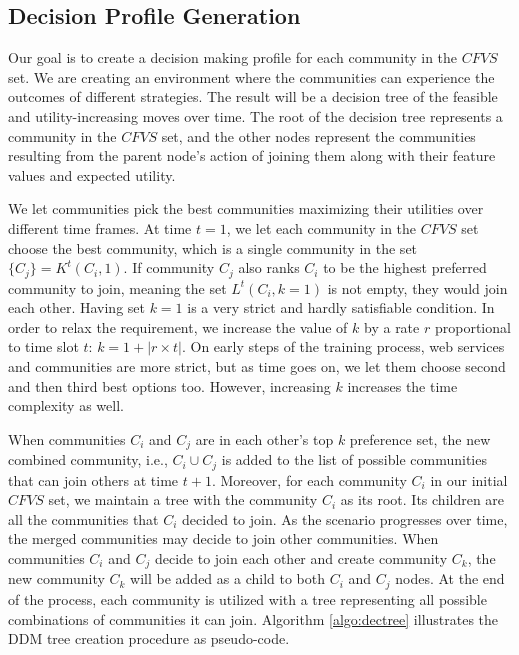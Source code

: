 \subsection{Decision Profile Generation}\label{ss:learningmodel}

Our goal is to create a decision making profile for each community in the
$CFVS$ set. We are creating an environment where the communities can experience the
outcomes of different strategies. The result will be a decision tree of the
feasible and utility-increasing moves over time. The root of the decision tree
represents a community in the $CFVS$ set, and the other nodes represent
the communities resulting from the parent node's action of joining them along with their feature values and
expected utility.


We let communities pick the best communities maximizing their utilities over different time frames. At time $t = 1$, we let each community in the $CFVS$ set choose the best community, which is a single community in the set $\{C_j\} = K^t(C_i, 1)$. If community $C_j$ also ranks $C_i$ to be the highest preferred community to join, meaning the set $L^t(C_i, k=1)$ is not empty, they would join each other. Having set $k = 1$ is a very strict and hardly satisfiable condition. In order to relax the requirement, we increase the value of $k$ by a rate $r$ proportional to time slot $t$: $k = 1 + |r \times t|$. On early steps of the training process, web services and communities are more strict, but as time goes on, we let them choose second and then third best options too. However, increasing $k$  increases the time complexity as well.

When communities $C_i$ and $C_j$ are in each other's top $k$ preference set, the new combined community, i.e., $C_i \cup C_j$ is added to the list of possible communities that can join others at time $t+1$. Moreover, for each community $C_i$ in our initial $CFVS$ set, we maintain a tree with the community $C_i$ as its root. Its children are all the communities that $C_i$ decided to join. As the scenario progresses over time, the merged communities may decide to join other communities. When communities $C_i$ and $C_j$ decide to join each other and create community $C_k$, the new community $C_k$ will be added as a child to both $C_i$ and $C_j$ nodes. At the end of the process, each community is utilized with a tree representing all possible combinations of communities it can join. Algorithm \ref{algo:dectree} illustrates the DDM tree creation procedure as pseudo-code.


